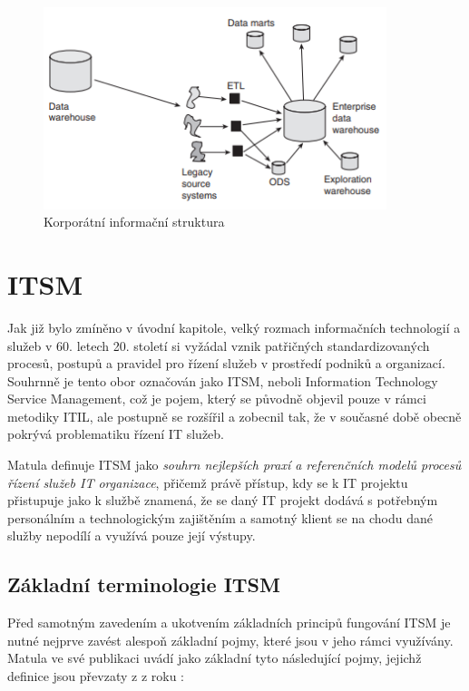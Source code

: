 \documentclass[
  digital,     %
  twoside,     %
  lof,         %
  lot,         %
]{fithesis4}
\begin{document}
\begin{figure}[h]
  \begin{center}
          \includegraphics[width=10cm]{img/data_marts_schema.png}
  \end{center}
  \caption{Korporátní informační struktura \parencite[s.12]{Inmon2008}}
  \label{fig:data_marts_schema}
\end{figure}  



\chapter{ITSM}
Jak již bylo zmíněno v úvodní kapitole, velký rozmach informačních technologií a služeb v 60. letech 20. století si vyžádal vznik patřičných standardizovaných procesů, postupů a pravidel pro řízení služeb v prostředí podniků a organizací. Souhrnně je tento obor označován jako ITSM, neboli Information Technology Service Management, což je pojem, který se původně objevil pouze v rámci metodiky ITIL, ale postupně se rozšířil a zobecnil tak, že v současné době obecně pokrývá problematiku řízení IT služeb.\parencite[s.~20]{Matula2017} 

Matula definuje ITSM jako \textit{souhrn nejlepších praxí a referenčních modelů procesů řízení služeb IT organizace}, přičemž právě přístup, kdy se k IT projektu přistupuje jako k službě znamená, že se daný IT projekt dodává s potřebným personálním a technologickým zajištěním a samotný klient se na chodu dané služby nepodílí a využívá pouze její výstupy.\parencite[s.~20-22]{Matula2017}

\section{Základní terminologie ITSM}
Před samotným zavedením a ukotvením základních principů fungování ITSM je nutné nejprve zavést alespoň základní pojmy, které jsou v jeho rámci využívány. Matula ve své publikaci  uvádí jako základní tyto následující pojmy, jejichž definice jsou převzaty z  z roku \citeyear{SyFvQA11lk1OaIec}:
\end{document}
